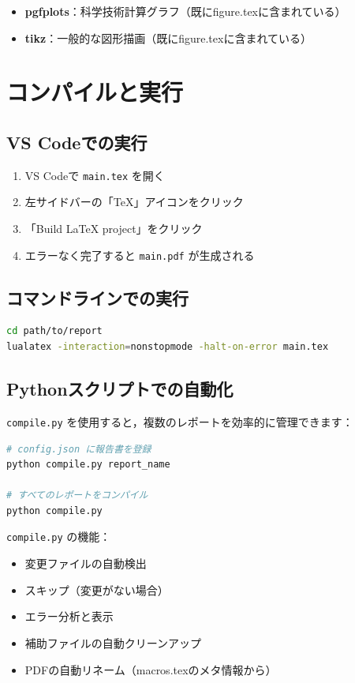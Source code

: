 \documentclass[11pt]{ltjarticle}
\begin{document}
\begin{itemize}
  \item \textbf{pgfplots}：科学技術計算グラフ（既にfigure.texに含まれている）
  \item \textbf{tikz}：一般的な図形描画（既にfigure.texに含まれている）
\end{itemize}

\section{コンパイルと実行}

\subsection{VS Codeでの実行}

\begin{enumerate}
  \item VS Codeで \texttt{main.tex} を開く
  \item 左サイドバーの「TeX」アイコンをクリック
  \item 「Build LaTeX project」をクリック
  \item エラーなく完了すると \texttt{main.pdf} が生成される
\end{enumerate}

\subsection{コマンドラインでの実行}

\begin{lstlisting}[language=bash]
cd path/to/report
lualatex -interaction=nonstopmode -halt-on-error main.tex
\end{lstlisting}

\subsection{Pythonスクリプトでの自動化}

\texttt{compile.py} を使用すると，複数のレポートを効率的に管理できます：

\begin{lstlisting}[language=bash]
# config.json に報告書を登録
python compile.py report_name

# すべてのレポートをコンパイル
python compile.py
\end{lstlisting}

\texttt{compile.py} の機能：

\begin{itemize}
  \item 変更ファイルの自動検出
  \item スキップ（変更がない場合）
  \item エラー分析と表示
  \item 補助ファイルの自動クリーンアップ
  \item PDFの自動リネーム（macros.texのメタ情報から）
\end{itemize}
\end{document}
